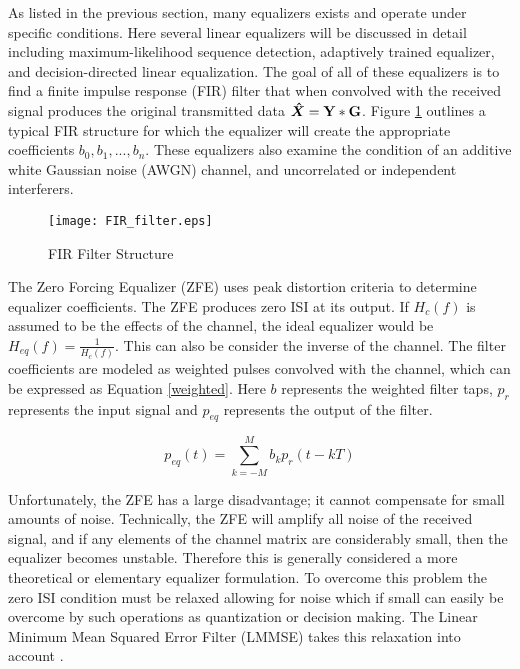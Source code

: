 As listed in the previous section, many equalizers exists and operate under specific conditions.  Here several linear equalizers will be discussed in detail including maximum-likelihood sequence detection, adaptively trained equalizer, and decision-directed linear equalization.  The goal of all of these equalizers is to find a finite impulse response (FIR) filter that when convolved with the received signal produces the original transmitted data \( \boldsymbol{\hat{X}}=\bf{Y} * \bf{G} \).  Figure \ref{FIR_filter} outlines a typical FIR structure for which the equalizer will create the appropriate coefficients \(b_{0},b_{1},..., b_{n} \).  These equalizers also examine the condition of an additive white Gaussian noise (AWGN) channel, and uncorrelated or independent interferers.\\

\begin{figure}[!ht]\label{FIR_filter}
\centering
\texttt{[image: FIR\_filter.eps]}
\caption{FIR Filter Structure}
\end{figure}

The Zero Forcing Equalizer (ZFE) uses peak distortion criteria to determine equalizer coefficients.  The ZFE produces zero ISI at its output.  If \(H_{c}(f)\) is assumed to be the effects of the channel, the ideal equalizer would be \( H_{eq}(f)=\frac{1}{H_{c}(f)}\).  This can also be consider the inverse of the channel.  The filter coefficients are modeled as weighted pulses convolved with the channel, which can be expressed as Equation \eqref{weighted}.  Here \(b\) represents the weighted filter taps, \(p_{r}\) represents the input signal and \(p_{eq}\) represents the output of the filter.

\begin{equation}\label{weighted}
p_{eq}(t) = \displaystyle\sum_{k=-M}^{M} b_{k}p_{r}(t-kT)
\end{equation}

Unfortunately, the ZFE has a large disadvantage; it cannot compensate for small amounts of noise.  Technically, the ZFE will amplify all noise of the received signal, and if any elements of the channel matrix are considerably small, then the equalizer becomes unstable. Therefore this is generally considered a more theoretical or elementary equalizer formulation.  To overcome this problem the zero ISI condition must be relaxed allowing for noise which if small can easily be overcome by such operations as quantization or decision making.  The Linear Minimum Mean Squared Error Filter (LMMSE) takes this relaxation into account \cite{TBD}.\\ 

